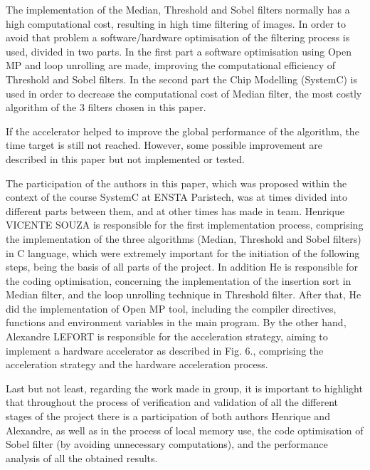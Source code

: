\documentclass[journal]{IEEEtran}
\begin{document}
The implementation of the Median, Threshold and Sobel filters normally has a high computational cost, resulting in high time filtering of images. In order to avoid that problem a software/hardware optimisation of the filtering process is used, divided in two parts. In the first part a software optimisation using Open MP and loop unrolling are made, improving the computational efficiency of Threshold and Sobel filters. In the second part the Chip Modelling (SystemC) is used in order to decrease the computational cost of Median filter, the most costly algorithm of the 3 filters chosen in this paper.

If the accelerator helped to improve the global performance of the algorithm, the time target is still not reached. However, some possible improvement are described in this paper but not implemented or tested. 

The participation of the authors in this paper, which was proposed within the context of the course SystemC at ENSTA Paristech, was at times divided into different parts between them, and at other times has made in team. Henrique VICENTE SOUZA is responsible for the first implementation process, comprising the implementation of the three algorithms (Median, Threshold and Sobel filters) in C language, which were extremely important for the initiation of the following steps, being the basis of all parts of the project. In addition He is responsible for the coding optimisation, concerning the implementation of the insertion sort in Median filter, and the loop unrolling technique in Threshold filter. After that, He did the implementation of Open MP tool, including the compiler directives, functions and environment variables in the main program. By the other hand, Alexandre LEFORT is responsible for the acceleration strategy, aiming to implement a hardware accelerator as described in Fig. \(6\)., comprising the acceleration strategy and the hardware acceleration process.

Last but not least, regarding the work made in group, it is important to highlight that throughout the process of verification and validation of all the different stages of the project there is a participation of both authors Henrique and Alexandre, as well as in the process of local memory use, the code optimisation of Sobel filter (by avoiding unnecessary computations), and the performance analysis of all the obtained results.



\appendices
\end{document}
